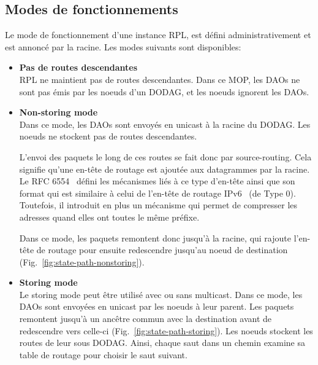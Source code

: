 \subsection*{Modes de fonctionnements}\label{subsec:state-mop}
    Le mode de fonctionnement d'une instance RPL, est défini administrativement et est annoncé par la racine. Les modes suivants sont disponibles:
    \begin{itemize}
        \item \textbf{Pas de routes descendantes}\\
            RPL ne maintient pas de routes descendantes. Dans ce MOP, les DAOs ne sont pas émis par les noeuds d'un DODAG, et les noeuds ignorent les DAOs.
        \item \textbf{Non-storing mode}\\
            Dans ce mode, les DAOs sont envoyés en unicast à la racine du DODAG.
            Les noeuds ne stockent pas de routes descendantes.
            
            L'envoi des paquets le long de ces routes se fait donc par source-routing. Cela signifie qu'une en-tête de routage est ajoutée aux datagrammes par la racine. Le RFC 6554~\cite{rfc:rpl-routing-header} défini les mécanismes liés à ce type d'en-tête ainsi que son format qui est similaire à celui de l'en-tête de routage IPv6~\cite{rfc:ipv6} (de Type 0). Toutefois, il introduit en plus un mécanisme qui permet de compresser les adresses quand elles ont toutes le même préfixe.

            Dans ce mode, les paquets remontent donc jusqu'à la racine, qui rajoute l'en-tête de routage pour ensuite redescendre jusqu'au noeud de destination (Fig.~\ref{fig:state-path-nonstoring}).
        \item \textbf{Storing mode}\\
            Le storing mode peut être utilisé avec ou sans multicast.
            Dans ce mode, les DAOs sont envoyées en unicast par les noeuds à leur parent.
            Les paquets remontent jusqu'à un ancêtre commun avec la destination avant de redescendre vers celle-ci (Fig.~\ref{fig:state-path-storing}).
            Les noeuds stockent les routes de leur sous DODAG. Ainsi, chaque saut dans un chemin examine sa table de routage pour choisir le saut suivant.
    \end{itemize}
    
